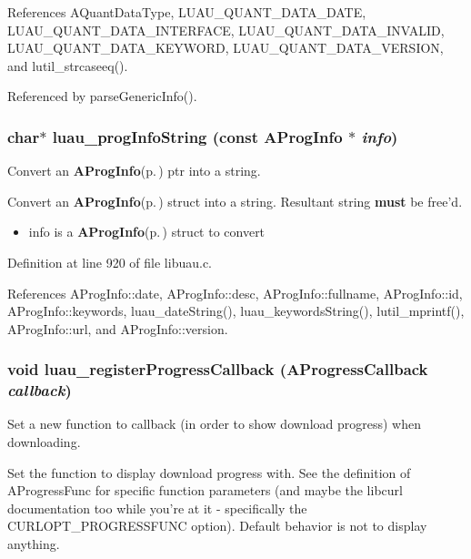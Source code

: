 References AQuant\-Data\-Type, LUAU\_\-QUANT\_\-DATA\_\-DATE, LUAU\_\-QUANT\_\-DATA\_\-INTERFACE, LUAU\_\-QUANT\_\-DATA\_\-INVALID, LUAU\_\-QUANT\_\-DATA\_\-KEYWORD, LUAU\_\-QUANT\_\-DATA\_\-VERSION, and lutil\_\-strcaseeq().

Referenced by parse\-Generic\-Info().
\subsubsection{\setlength{\rightskip}{0pt plus 5cm}char$\ast$ luau\_\-prog\-Info\-String (const {\bf AProg\-Info} $\ast$ {\em info})}\label{libuau_8c_a29}


Convert an {\bf AProg\-Info}{\rm (p.\,\pageref{structAProgInfo})} ptr into a string. 

Convert an {\bf AProg\-Info}{\rm (p.\,\pageref{structAProgInfo})} struct into a string. Resultant string {\bf must} be free'd.

\begin{itemize}
\item info is a {\bf AProg\-Info}{\rm (p.\,\pageref{structAProgInfo})} struct to convert 
\end{itemize}


Definition at line 920 of file libuau.c.

References AProg\-Info::date, AProg\-Info::desc, AProg\-Info::fullname, AProg\-Info::id, AProg\-Info::keywords, luau\_\-date\-String(), luau\_\-keywords\-String(), lutil\_\-mprintf(), AProg\-Info::url, and AProg\-Info::version.
\subsubsection{\setlength{\rightskip}{0pt plus 5cm}void luau\_\-register\-Progress\-Callback ({\bf AProgress\-Callback} {\em callback})}\label{libuau_8c_a14}


Set a new function to callback (in order to show download progress) when downloading. 

Set the function to display download progress with. See the definition of AProgress\-Func for specific function parameters (and maybe the libcurl documentation too while you're at it - specifically the CURLOPT\_\-PROGRESSFUNC option). Default behavior is not to display anything.

